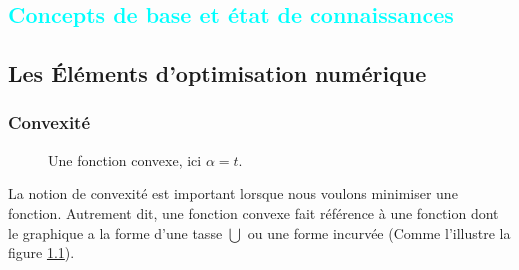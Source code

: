 
%
%

\textcolor{cyan}{\chapter{Concepts de base et état de connaissances}\label{chap:concept}}
	\section{Les Éléments d'optimisation numérique} \label{sec:optimisation}
		\subsection{Convexité} \label{subsec:convex}
		\begin{figure}
			\caption[Illustration d'une fonction convexe]{Une fonction convexe, ici $\alpha=t$. }
			\label{fig:convexe_graph}
		\end{figure}
		La notion de convexité est important lorsque nous voulons minimiser une fonction.
		Autrement dit, une fonction convexe fait référence à une fonction dont le graphique a la forme d'une tasse $\bigcup$ ou une forme incurvée (Comme l'illustre la figure \ref{fig:convexe_graph}).
		

